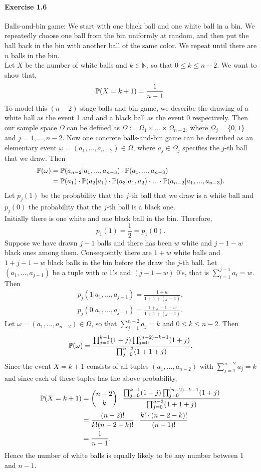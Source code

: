 \paragraph{Exercise 1.6} Balls-and-bin game: We start with one black ball and one
white ball in a bin. We repeatedly choose one ball from the bin uniformly at
random, and then put the ball back in the bin with another ball of the same color.
We repeat until there are $n$ balls in the bin. \\[0,2cm]
Let $X$ be the number of white balls and $k \in \mathbb{N}$, so that $0 \leq k
\leq n-2$. We want to show that,
\[ \mathbb{P}(X=k+1) = \frac{1}{n-1}. \]
To model this $(n-2)$-stage balls-and-bin game, we describe the drawing of a white
ball as the event 1 and and a black ball as the event 0 respectively. Then our
sample space $\Omega$ can be defined as $\Omega := \Omega_1 \times ... \times
\Omega_{n-2}$, where $\Omega_j = \{ 0, 1\}$ and $j = 1,...,n-2$. Now one concrete
balls-and-bin game can be described as an elementary event $\omega =
(a_1,...,a_{n-2}) \in \Omega$, where $a_j \in \Omega_j$ specifies the $j$-th ball
that we draw. Then
\begin{align*}
  \mathbb{P}(\omega)
    &= \mathbb{P}(a_{n-2}| a_1,...,a_{n-3}) \cdot \mathbb{P}(a_1,...,a_{n-3}) \\
    &= \mathbb{P}(a_1) \cdot \mathbb{P}(a_2| a_1) \cdot \mathbb{P}(a_3| a_1,a_2) \cdot ... \cdot \mathbb{P}(a_{n-2}| a_1,...,a_{n-3}).
\end{align*}
Let $p_j(1)$ be the probability that the $j$-th ball that we draw is
a white ball and $p_j(0)$ the probability that the $j$-th ball is a black one. \\
Initially there is one white and one black ball in the bin. Therefore,
\[ p_1(1) = \frac{1}{2} = p_1(0). \]
Suppose we have drawn $j-1$ balls and there has been $w$ white and $j-1-w$ black
ones among them. Consequently there are $1 + w$ white balls and $1 + j - 1 - w$
black balls in the bin before the draw the $j$-th ball. Let
$\left(a_1,...,a_{j-1}\right)$ be a tuple with $w$ 1's and $(j-1-w)$ 0's, that is
$\sum_{i=1}^{j-1}a_i = w$. Then
\begin{align*}
    p_j(1|a_1,...,a_{j-1}) = \frac{1 + w}{1 + 1 + (j-1)}, \\
    p_j(0|a_1,...,a_{j-1}) = \frac{1+j-1-w}{1 + 1 + (j-1)}.
\end{align*}
Let $\omega = (a_1, ..., a_{n-2}) \in \Omega$, so that $\sum_{j=1}^{n-2}a_j = k$
and $0 \leq k \leq n-2$. Then
\[
  \mathbb{P}(\omega) = \frac {\prod_{j=0}^{k-1}(1 + j) \prod_{j=0}^{(n-2)-k-1}(1 + j)}
                      {\prod_{j=0}^{n-3}(1+1+j)}.
\]
Since the event $X=k+1$ consists of all tuples $(a_1,...,a_{n-2})$ with
$\sum_{j=1}^{n-2}a_j = k$ and since each of these tuples has the above probability,
\begin{align*}
  \mathbb{P}(X=k+1)
    &= \binom{n-2}{k} \cdot \frac {\prod_{j=0}^{k-1}(1 + j) \prod_{j=0}^{(n-2)-k-1}(1 + j)}{\prod_{j=0}^{n-3}(1+1+j)} \\
    &= \frac{(n-2)!}{k! (n-2-k)!} \cdot \frac{k! \cdot (n-2-k)!}{(n-1)!} \\
    &= \frac{1}{n-1}.
\end{align*}
Hence the number of white balls is equally likely to be any number between 1 and
$n-1$.
